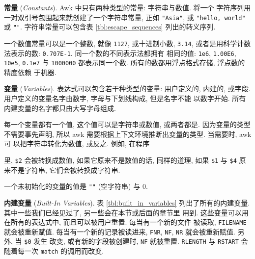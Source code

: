 \textbf{常量} (\emph{Constants}). Awk 中只有两种类型的常量: 字符串与数值.
将一个
字符序列用一对双引号包围起来就创建了一个字符串常量, 正如 \verb'"Asia"',
或 \verb'"hello, world"' 或 \verb'""'. 字符串常量可以包含表
\ref{tbl:escape_sequences} 列出的转义序列.

一个数值常量可以是一个整数, 就像 \verb'1127', 或十进制小数, \verb'3.14',
或者是用科学计数法表示的数: \verb'0.707E-1'. 同一个数的不同表示法都拥有
相同的值: \verb'1e6', \verb'1.00E6', \verb'10e5', \verb'0.1e7' 与
\verb'1000000' 都表示同一个数. 所有的数都用浮点格式存储, 浮点数的精度依赖
于机器.

\textbf{变量} (\emph{Variables}). 表达式可以包含若干种类型的变量: 用户定义的,
内建的, 或字段. 用户定义的变量名字由数字, 字母与下划线构成, 但是名字不能
以数字开始. 所有内建变量的名字都只由大写字母组成.

每一个变量都有一个值, 这个值可以是字符串或数值, 或两者都是. 因为变量的类型
不需要事先声明, 所以 awk 需要根据上下文环境推断出变量的类型.
当需要时, awk 可
以把字符串转化为数值, 或反之. 例如, 在程序
里, \verb'$2' 会被转换成数值, 如果它原来不是数值的话, 同样的道理, 如果 \verb'$1'
与 \verb'$4' 原来不是字符串, 它们会被转换成字符串.

一个未初始化的变量的值是 \verb'""' (空字符串) 与 0.

\textbf{内建变量} (\emph{Built-In Variables}). 表 \ref{tbl:built_in_variables}
列出了所有的内建变量. 其中一些我们已经见过了, 另一些会在本节或后面的章节里
用到. 这些变量可以用在所有的表达式中, 而且可以被用户重置. 每当有一个新的文件
被读取, \verb'FILENAME' 就会被重新赋值. 每当有一个新的记录被读进来,
\verb'FNR', \verb'NF', \verb'NR' 就会被重新赋值. 另外, 当 \verb'$0' 发生
改变, 或有新的字段被创建时, \verb'NF' 就被重置. \verb'RLENGTH' 与
\verb'RSTART' 会随着每一次 \verb'match' 的调用而改变.

